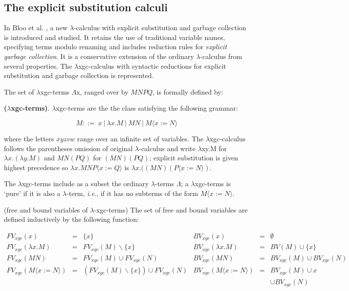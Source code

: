 \subsection{The explicit substitution calculi}

In Bloo et al. \cite{bloo1995preservation}, a new $\lambda$-calculus with explicit substitution and garbage collection is introduced and studied. It retains the use of traditional variable names, specifying terms modulo renaming and includes reduction rules for \textit{explicit garbage collection}. It is a conservative extension of the ordinary $\lambda$-calculus from several properties. The $\lambda$xgc-calculus with syntactic reductions for explicit substitution and garbage collection is represented.    

\noindent The set of $\lambda$xgc-terms $\Lambda$x, ranged over by $MNPQ$, is formally defined by: 
\begin{def1}
\normalfont \textbf{($\lambda$xgc-terms)}. $\lambda$xgc-terms are the the class satisfying the following grammar: 
\end{def1}
\begin{equation*}
M ::= \ x\ |\ \lambda x.M\ |\ MN\ |\ M\langle x:=N\rangle
\end{equation*}

where the letters $xyzvw$ range over an infinite set of variables. The $\lambda$xgc-calculus follows the parentheses omission of original $\lambda$-calculus and write $\lambda$xy.M for $\lambda x.(\lambda y.M)$ and $MN(PQ)$ for $(MN)(PQ)$; explicit substitution is given highest precedence so $\lambda x.MNP\langle x:=Q\rangle $ is $\lambda x.((MN)(P\langle x:=N\rangle )$.

The $\lambda$xgc-terms include as a subset the ordinary $\lambda$-terms $\Lambda$; a $\lambda$xgc-terms is `pure' if it is also a $\lambda$-term, \textit{i.e.}, if it has no subterms of the form $M\langle x:=N\rangle$.

\begin{def1}
\normalfont (free and bound variables of $\lambda$-xgc-terms) The set of free and bound variables are defined inductively by the following function:
\end{def1}
\begin{equation*}\label{eq:fvxgc}
\begin{array}{lcllcl}
FV_{xgc}(x)           & = & \{x\}             & BV_{xgc}(x)           &=& \emptyset\\
FV_{xgc}(\lambda x.M) & = & FV_{xgc}(M)\backslash \{x\} & BV_{xgc}(\lambda x.M) &=& BV(M)\cup \{x\}\\
FV_{xgc}(MN)          & = & FV_{xgc}(M)\cup FV_{xgc}(N) & BV_{xgc}(MN)          &=& BV_{xgc}(M)\cup BV_{xgc}(N)\\
FV_{xgc}(M\langle x:=N\rangle)          & = & (FV_{xgc}(M)\backslash \{x\})\cup FV_{xgc}(N) & BV_{xgc}(M\langle x:=N\rangle)    &=& BV_{xgc}(M)\cup {x} \\
                                   &&&&&\cup BV_{xgc}(N)
\end{array}
\end{equation*}

